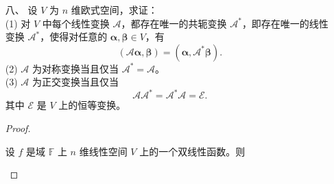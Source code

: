 \begin{enumerate}[1~]
\item[八、]
设 $V$ 为 $n$ 维欧式空间，求证：\\
(1) 对 $V$ 中每个线性变换 $\mathscr{A}$，都存在唯一的共轭变换 $\mathscr { A } ^ { * }$，即存在唯一的线性变换 $\mathscr { A } ^ { * }$，使得对任意的 $ \boldsymbol{\alpha} , \boldsymbol{\beta} \in
V$，有\[
( \mathscr { A } \boldsymbol{\alpha} , \boldsymbol{\beta} ) = \left( \boldsymbol{\alpha} , \mathscr { A } ^ { * } \boldsymbol{\beta} \right).
\]
(2) $\mathscr { A }$ 为对称变换当且仅当 $\mathscr { A } ^ { * } = \mathscr { A }$。\\
(3) $\mathscr { A }$ 为正交变换当且仅当\[
\mathscr { A } \mathscr { A } ^ { * } = \mathscr { A } ^ { * } \mathscr { A } = \mathscr { E }.
\]
其中 $\mathscr { E }$ 是 $V$ 上的恒等变换。
\begin{proof}
\begin{lemma}
设 $f$ 是域 $\mathbb{F}$ 上 $n$ 维线性空间 $V$ 上的一个双线性函数。则


\end{lemma}
\end{proof}
\end{enumerate}
